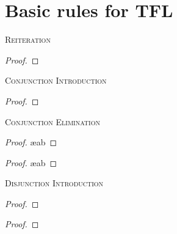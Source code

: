 

\newpage


\label{ProofRules} 
\section{Basic rules for TFL}

\begin{multicols}{2}

\noindent\textsc{Reiteration}

\begin{proof}
	 
\end{proof}
\bigskip


\noindent\textsc{Conjunction Introduction}

\begin{proof}
	 
\end{proof}
\bigskip


\noindent\textsc{Conjunction Elimination}

\begin{proof}
	 \ae{ab}
\end{proof}

\begin{proof}
	 \ae{ab}
\end{proof}
\bigskip


\noindent\textsc{Disjunction Introduction}

\begin{proof}
\end{proof}

\begin{proof}
\end{proof}
\bigskip

\vfill\null
\columnbreak


\end{multicols}
